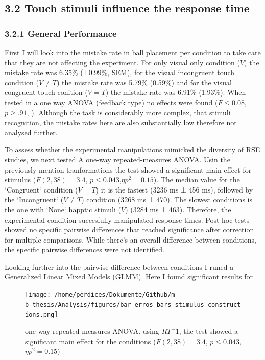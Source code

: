 \documentclass[12pt,oneside,openright]{report}
\begin{document}
    
\subsection*{3.2 Touch stimuli influence the response time}
\subsubsection*{3.2.1 General Performance}

First I will look into the mistake rate in ball placement per condition to take care that they are not affecting the experiment. For only visual only condition ($V$) the mistake rate was 6.35\% (±0.99\%, SEM), for the visual incongruent touch condition ($V \neq T$) the mistake rate was 5.79\% (0.59\%) and for the visual congruent touch conition ($V=T$) the mistake rate was 6.91\% (1.93\%). When tested in a one way  ANOVA (feedback type) no effects were found ($ F \leq0.08$, $p\geq.91 $, ). Although the task is considerably more complex, that stimuli recognition, the mistake rates here are also substantially low therefore not analysed further. 

To assess whether the experimental manipulations mimicked the diversity of RSE studies, we next tested A one-way repeated-measures ANOVA. Usin the previously mention tranformations the test showed a significant main effect for stimulus ($F(2,38) = 3.4$, $p\leq0.043 $,$\eta p^2 =0.15$). The  median value for the `Congruent` condition ($V=T$)  it is the fastest (3236 ms ± 456 ms), followed by the `Incongruent` ($V \neq T$) condition (3268 ms ± 470). The slowest conditions is the one with `None` happtic stimuli ($V$) (3284 ms ± 463). Therefore, the experimental condition succesfully manipulated response times. Post hoc tests showed no specific pairwise differences that reached significance after correction for multiple comparisons. While there's an overall difference between conditions, the specific pairwise differences were not identified. 

Looking further into the pairwise difference between conditions I runed a Generalized Linear Mixed Models (GLMM). Here I found significant results for 






\begin{figure}[!ht]
    \centering
    \texttt{[image: /home/perdices/Dokumente/Github/m-b\_thesis/Analysis/figures/bar\_erros\_bars\_stimulus\_constructions.png]}
    \caption{one-way repeated-measures ANOVA. using $RT^-1$, the test showed a significant main effect for the conditions ($F(2,38) = 3.4$, $p\leq0.043 $,$\eta p^2 =0.15$)}
    \label{fig:mesh2}
\end{figure}
\end{document}
